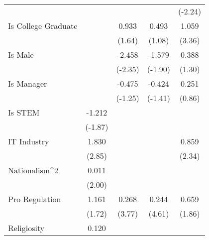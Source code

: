 {\begin{tabular}{l*{4}{c}}
                         &                     &                     &                     &     (-2.24)         \\
\addlinespace
Is College Graduate      &                     &       0.933         &       0.493         &       1.059\sym{***}\\
                         &                     &      (1.64)         &      (1.08)         &      (3.36)         \\
\addlinespace
Is Male                  &                     &      -2.458\sym{*}  &      -1.579\sym{*}  &       0.388         \\
                         &                     &     (-2.35)         &     (-1.90)         &      (1.30)         \\
\addlinespace
Is Manager               &                     &      -0.475         &      -0.424         &       0.251         \\
                         &                     &     (-1.25)         &     (-1.41)         &      (0.86)         \\
\addlinespace
Is STEM                  &      -1.212\sym{*}  &                     &                     &                     \\
                         &     (-1.87)         &                     &                     &                     \\
\addlinespace
IT Industry              &       1.830\sym{**} &                     &                     &       0.859\sym{*}  \\
                         &      (2.85)         &                     &                     &      (2.34)         \\
\addlinespace
Nationalism^2            &       0.011\sym{*}  &                     &                     &                     \\
                         &      (2.00)         &                     &                     &                     \\
\addlinespace
Pro Regulation           &       1.161\sym{*}  &       0.268\sym{***}&       0.244\sym{***}&       0.659\sym{*}  \\
                         &      (1.72)         &      (3.77)         &      (4.61)         &      (1.86)         \\
\addlinespace
Religiosity              &       0.120\sym{*}  &                     &                     &                     \\

\end{tabular}}
